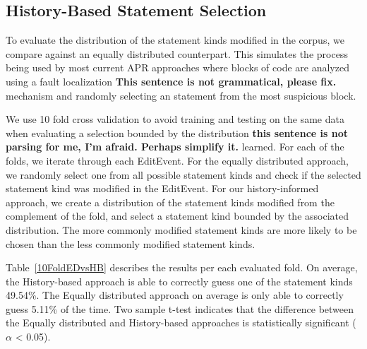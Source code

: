 \documentclass[sigconf]{acmart}
\newcommand{\todo}[1]
  {{\scriptsize \textbf{\color{red} {#1}}}}
\begin{document}
\subsection{History-Based Statement Selection}

To evaluate the distribution of the statement kinds modified
in the corpus, we compare against an equally distributed counterpart.
This simulates the process being used by most current APR approaches
where blocks of code are analyzed using a fault localization 
\todo{This sentence is not grammatical, please fix.}
mechanism and randomly selecting an statement from the most
suspicious block.

We use 10 fold
cross validation to avoid training and testing on the same data
when evaluating a selection bounded by the distribution
\todo{this sentence is not parsing for me, I'm afraid.  Perhaps simplify it.}
learned. For each of the folds, we
iterate through each EditEvent. For
the equally distributed approach, we randomly select one from 
all possible statement kinds and check if the selected
statement kind was modified in the EditEvent.
For our history-informed approach, we create a distribution
of the statement kinds modified from the complement of the fold, 
and select a statement
kind bounded by the associated distribution.
The more commonly modified statement
kinds are more likely to be chosen than the less commonly modified
statement kinds.

Table~\ref{10FoldEDvsHB} describes the results per each evaluated fold.
On average, 
the History-based approach is able to correctly guess one of the statement kinds
49.54\%. The Equally distributed approach
on average is only able to correctly guess 5.11\% of the time.
Two sample t-test indicates that the difference between the Equally distributed
and History-based approaches is statistically significant ($\alpha$ < 0.05).
\end{document}
